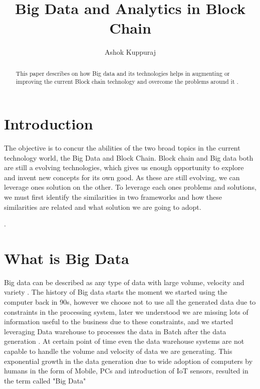 \documentclass[sigconf]{acmart}
\begin{document}
\title{Big Data and Analytics in Block Chain}


\author{Ashok Kuppuraj}


\renewcommand{\shortauthors}{G. v. Laszewski}


\begin{abstract}
This paper describes on how Big data and its technologies helps in augmenting or improving the current Block chain technology and overcome  the problems around it .
\end{abstract}



\maketitle

\section{Introduction}
The objective is to concur the abilities of the two broad topics in the current technology world, the Big Data and Block Chain. Block chain and Big data both are still a evolving technologies, which gives us enough opportunity to explore and invent new concepts for its own good. As these are still evolving, we can leverage ones solution on the other.  To leverage each ones problems and solutions, we must first identify the similarities in  two frameworks and how these similarities are related and what solution we are going to adopt. 

 \cite{editor00}.

\section{What is Big Data}
Big data can be described as any type of data with large volume, velocity and variety \cite{Bigdataintro}. The history of Big data starts the moment we started using the computer back in 90s, however we choose not to use all the generated data due to constraints in the processing system, later we understood we are missing lots of information useful to the business due to these constraints, and we started leveraging Data warehouse to processes the data in Batch after the data generation . At certain point of time even the data warehouse systems are not capable to handle the volume and velocity of data we are generating. This exponential growth in the data generation due to wide adoption of computers by humans in the form of Mobile, PCs and introduction of IoT sensors, resulted in the term called "Big Data" \cite{article2}
\end{document}
